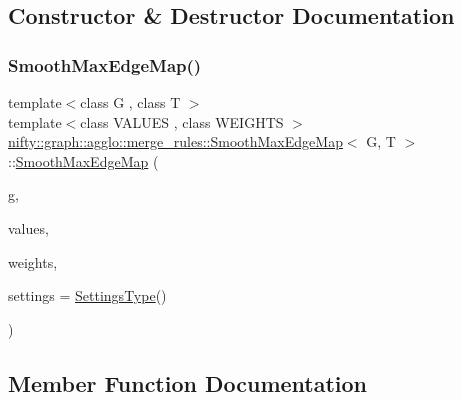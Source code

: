 \subsection{Constructor \& Destructor Documentation}
\mbox{\label{classnifty_1_1graph_1_1agglo_1_1merge__rules_1_1SmoothMaxEdgeMap_a4aa821c3b693ed4eb550d4d0b4579e1f}} 
\subsubsection{\texorpdfstring{Smooth\+Max\+Edge\+Map()}{SmoothMaxEdgeMap()}}
{\footnotesize\ttfamily template$<$class G , class T $>$ \\
template$<$class V\+A\+L\+U\+ES , class W\+E\+I\+G\+H\+TS $>$ \\
\hyperlink{classnifty_1_1graph_1_1agglo_1_1merge__rules_1_1SmoothMaxEdgeMap}{nifty\+::graph\+::agglo\+::merge\+\_\+rules\+::\+Smooth\+Max\+Edge\+Map}$<$ G, T $>$\+::\hyperlink{classnifty_1_1graph_1_1agglo_1_1merge__rules_1_1SmoothMaxEdgeMap}{Smooth\+Max\+Edge\+Map} (\begin{DoxyParamCaption}\item[{const \hyperlink{classnifty_1_1graph_1_1agglo_1_1merge__rules_1_1SmoothMaxEdgeMap_a30c83f3e3f699c7060a9e9605672246b}{Graph\+Type} \&}]{g,  }\item[{const V\+A\+L\+U\+ES \&}]{values,  }\item[{const W\+E\+I\+G\+H\+TS \&}]{weights,  }\item[{const \hyperlink{classnifty_1_1graph_1_1agglo_1_1merge__rules_1_1SmoothMaxEdgeMap_a0f463ebc561d6770fa59b4168e4acf98}{Settings\+Type} \&}]{settings = {\ttfamily \hyperlink{classnifty_1_1graph_1_1agglo_1_1merge__rules_1_1SmoothMaxEdgeMap_a0f463ebc561d6770fa59b4168e4acf98}{Settings\+Type}()} }\end{DoxyParamCaption})\hspace{0.3cm}{\ttfamily [inline]}}



\subsection{Member Function Documentation}
\mbox{\label{classnifty_1_1graph_1_1agglo_1_1merge__rules_1_1SmoothMaxEdgeMap_a45a0264cbcf21f248437444510b7cb6c}} 
